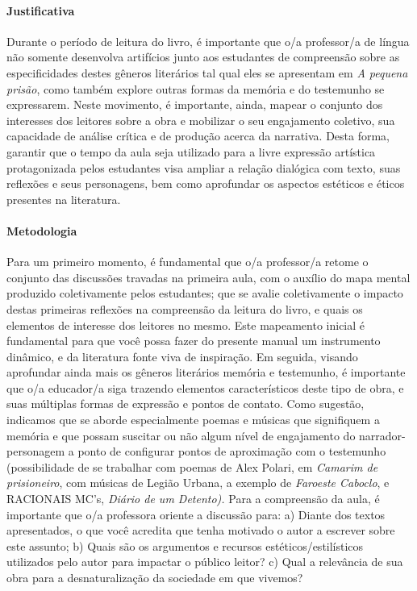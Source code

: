 \documentclass[11pt]{extarticle}
\begin{document}
\paragraph{Justificativa} Durante o período de leitura do livro, é
importante que o/a professor/a de língua não somente desenvolva
artifícios junto aos estudantes de compreensão sobre as especificidades
destes gêneros literários tal qual eles se apresentam em \emph{A pequena
prisão}, como também explore outras formas da memória e do testemunho se
expressarem. Neste movimento, é importante, ainda, mapear o conjunto dos
interesses dos leitores sobre a obra e mobilizar o seu engajamento
coletivo, sua capacidade de análise crítica e de produção acerca da
narrativa. Desta forma, garantir que o tempo da aula seja utilizado para
a livre expressão artística protagonizada pelos estudantes visa ampliar
a relação dialógica com texto, suas reflexões e seus personagens, bem
como aprofundar os aspectos estéticos e éticos presentes na literatura.

\paragraph{Metodologia} Para um primeiro momento, é fundamental que o/a
professor/a retome o conjunto das discussões travadas na primeira aula,
com o auxílio do mapa mental produzido coletivamente pelos estudantes;
que se avalie coletivamente o impacto destas primeiras reflexões na
compreensão da leitura do livro, e quais os elementos de interesse dos
leitores no mesmo. Este mapeamento inicial é fundamental para que você
possa fazer do presente manual um instrumento dinâmico, e da literatura
fonte viva de inspiração. Em seguida, visando aprofundar ainda mais os
gêneros literários memória e testemunho, é importante que o/a educador/a
siga trazendo elementos característicos deste tipo de obra, e suas
múltiplas formas de expressão e pontos de contato. Como sugestão,
indicamos que se aborde especialmente poemas e músicas que signifiquem a
memória e que possam suscitar ou não algum nível de engajamento do
narrador-personagem a ponto de configurar pontos de aproximação com o
testemunho (possibilidade de se trabalhar com poemas de Alex Polari, em
\emph{Camarim de prisioneiro}, com músicas de Legião Urbana, a exemplo
de \emph{Faroeste Caboclo}, e RACIONAIS MC's, \emph{Diário de um
Detento).} Para a compreensão da aula, é importante que o/a professora
oriente a discussão para: a) Diante dos textos apresentados, o que você
acredita que tenha motivado o autor a escrever sobre este assunto; b)
Quais são os argumentos e recursos estéticos/estilísticos utilizados
pelo autor para impactar o público leitor? c) Qual a relevância de sua
obra para a desnaturalização da sociedade em que vivemos?
\end{document}
